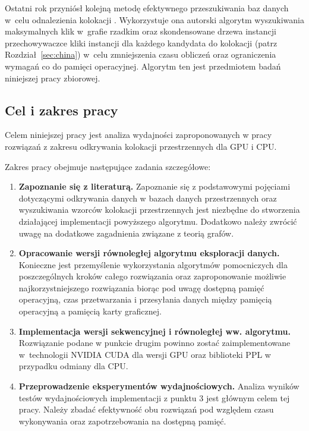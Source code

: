 \documentclass[12pt]{article}
\begin{document}
Ostatni rok przyniósł kolejną metodę efektywnego przeszukiwania baz danych w~celu odnalezienia kolokacji \cite{chinczyki}. Wykorzystuje ona autorski algorytm wyszukiwania maksymalnych klik w~grafie rzadkim oraz skondensowane drzewa instancji przechowywaczce kliki instancji dla każdego kandydata do kolokacji (patrz Rozdział~\ref{sec:china}) w~celu zmniejszenia czasu obliczeń oraz ograniczenia wymagań co do pamięci operacyjnej. Algorytm ten jest przedmiotem badań niniejszej pracy zbiorowej.

\subsection{Cel i zakres pracy}

Celem niniejszej pracy jest analiza wydajności zaproponowanych w pracy \cite{chinczyki} rozwiązań z zakresu odkrywania kolokacji przestrzennych dla GPU i CPU.

Zakres pracy obejmuje następujące zadania szczegółowe:

\begin{enumerate}
\item \textbf{Zapoznanie się z literaturą.} Zapoznanie się z podstawowymi pojęciami dotyczącymi odkrywania danych w bazach danych przestrzennych oraz wyszukiwania wzorców kolokacji przestrzennych jest niezbędne do stworzenia działającej implementacji powyższego algorytmu. Dodatkowo należy zwrócić uwagę na dodatkowe zagadnienia związane z teorią grafów.
\item \textbf{Opracowanie wersji równoległej algorytmu eksploracji danych.} Konieczne jest przemyślenie wykorzystania algorytmów pomocniczych dla poszczególnych kroków całego rozwiązania oraz zaproponowanie możliwie najkorzystniejszego rozwiązania biorąc pod uwagę dostępną pamięć operacyjną, czas przetwarzania i przesyłania danych między pamięcią operacyjną a pamięcią karty graficznej.
\item \textbf{Implementacja wersji sekwencyjnej i równoległej ww. algorytmu.} Rozwiązanie podane w punkcie drugim powinno zostać zaimplementowane w~technologii NVIDIA CUDA dla wersji GPU oraz biblioteki PPL w przypadku odmiany dla CPU.
\item \textbf{Przeprowadzenie eksperymentów wydajnościowych.} Analiza wyników testów wydajnościowych implementacji z punktu 3 jest głównym celem tej pracy. Należy zbadać efektywność obu rozwiązań pod względem czasu wykonywania oraz zapotrzebowania na dostępną pamięć. 
\end{enumerate}
\end{document}
